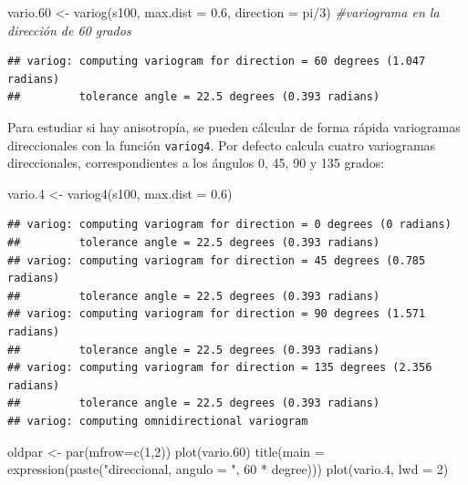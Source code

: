 \documentclass[
  spanish,
]{book}
\newenvironment{Shaded}{\begin{snugshade}}{\end{snugshade}}
\newcommand{\AttributeTok}[1]{\textcolor[rgb]{0.77,0.63,0.00}{#1}}
\newcommand{\CommentTok}[1]{\textcolor[rgb]{0.56,0.35,0.01}{\textit{#1}}}
\newcommand{\DecValTok}[1]{\textcolor[rgb]{0.00,0.00,0.81}{#1}}
\newcommand{\FloatTok}[1]{\textcolor[rgb]{0.00,0.00,0.81}{#1}}
\newcommand{\FunctionTok}[1]{\textcolor[rgb]{0.00,0.00,0.00}{#1}}
\newcommand{\NormalTok}[1]{#1}
\newcommand{\OtherTok}[1]{\textcolor[rgb]{0.56,0.35,0.01}{#1}}
\newcommand{\SpecialCharTok}[1]{\textcolor[rgb]{0.00,0.00,0.00}{#1}}
\newcommand{\StringTok}[1]{\textcolor[rgb]{0.31,0.60,0.02}{#1}}
\theoremstyle{break}
\begin{document}
\begin{Shaded}
\begin{Highlighting}[]
\NormalTok{vario}\FloatTok{.60} \OtherTok{\textless{}{-}} \FunctionTok{variog}\NormalTok{(s100, }\AttributeTok{max.dist =} \FloatTok{0.6}\NormalTok{, }\AttributeTok{direction =}\NormalTok{ pi}\SpecialCharTok{/}\DecValTok{3}\NormalTok{) }\CommentTok{\#variograma en la dirección de 60 grados}
\end{Highlighting}
\end{Shaded}

\begin{verbatim}
## variog: computing variogram for direction = 60 degrees (1.047 radians)
##         tolerance angle = 22.5 degrees (0.393 radians)
\end{verbatim}

Para estudiar si hay anisotropía, se pueden cálcular de forma rápida variogramas
direccionales con la función \texttt{variog4}. Por defecto calcula cuatro variogramas
direccionales, correspondientes a los ángulos 0, 45, 90 y 135 grados:

\begin{Shaded}
\begin{Highlighting}[]
\NormalTok{vario}\FloatTok{.4} \OtherTok{\textless{}{-}} \FunctionTok{variog4}\NormalTok{(s100, }\AttributeTok{max.dist =} \FloatTok{0.6}\NormalTok{)}
\end{Highlighting}
\end{Shaded}

\begin{verbatim}
## variog: computing variogram for direction = 0 degrees (0 radians)
##         tolerance angle = 22.5 degrees (0.393 radians)
## variog: computing variogram for direction = 45 degrees (0.785 radians)
##         tolerance angle = 22.5 degrees (0.393 radians)
## variog: computing variogram for direction = 90 degrees (1.571 radians)
##         tolerance angle = 22.5 degrees (0.393 radians)
## variog: computing variogram for direction = 135 degrees (2.356 radians)
##         tolerance angle = 22.5 degrees (0.393 radians)
## variog: computing omnidirectional variogram
\end{verbatim}

\begin{Shaded}
\begin{Highlighting}[]
\NormalTok{oldpar }\OtherTok{\textless{}{-}} \FunctionTok{par}\NormalTok{(}\AttributeTok{mfrow=}\FunctionTok{c}\NormalTok{(}\DecValTok{1}\NormalTok{,}\DecValTok{2}\NormalTok{))}
\FunctionTok{plot}\NormalTok{(vario}\FloatTok{.60}\NormalTok{)}
\FunctionTok{title}\NormalTok{(}\AttributeTok{main =} \FunctionTok{expression}\NormalTok{(}\FunctionTok{paste}\NormalTok{(}\StringTok{"direccional, angulo = "}\NormalTok{, }\DecValTok{60} \SpecialCharTok{*}\NormalTok{ degree)))}
\FunctionTok{plot}\NormalTok{(vario}\FloatTok{.4}\NormalTok{, }\AttributeTok{lwd =} \DecValTok{2}\NormalTok{)}
\end{Highlighting}
\end{Shaded}
\end{document}
